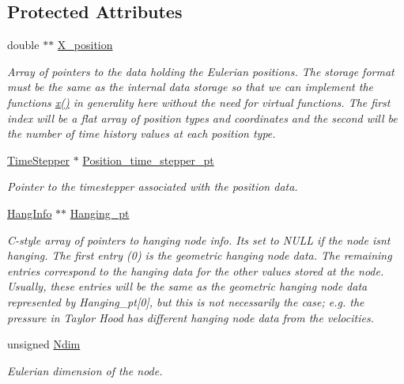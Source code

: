 \subsection*{Protected Attributes}
\begin{DoxyCompactItemize}
\item 
double $\ast$$\ast$ \hyperlink{classoomph_1_1Node_a908941e709ac28995147ab090f2cbf90}{X\+\_\+position}
\begin{DoxyCompactList}\small\item\em Array of pointers to the data holding the Eulerian positions. The storage format must be the same as the internal data storage so that we can implement the functions \hyperlink{classoomph_1_1Node_a056f8e82da938369cd38541c5cdc598a}{x()} in generality here without the need for virtual functions. The first index will be a flat array of position types and coordinates and the second will be the number of time history values at each position type. \end{DoxyCompactList}\item 
\hyperlink{classoomph_1_1TimeStepper}{Time\+Stepper} $\ast$ \hyperlink{classoomph_1_1Node_a8cf734873ab29a412289f8ac2d3be348}{Position\+\_\+time\+\_\+stepper\+\_\+pt}
\begin{DoxyCompactList}\small\item\em Pointer to the timestepper associated with the position data. \end{DoxyCompactList}\item 
\hyperlink{classoomph_1_1HangInfo}{Hang\+Info} $\ast$$\ast$ \hyperlink{classoomph_1_1Node_a4efe1b8b72dd6eb748dd21109eb1bf54}{Hanging\+\_\+pt}
\begin{DoxyCompactList}\small\item\em C-\/style array of pointers to hanging node info. It\textquotesingle{}s set to N\+U\+LL if the node isn\textquotesingle{}t hanging. The first entry (0) is the geometric hanging node data. The remaining entries correspond to the hanging data for the other values stored at the node. Usually, these entries will be the same as the geometric hanging node data represented by Hanging\+\_\+pt\mbox{[}0\mbox{]}, but this is not necessarily the case; e.\+g. the pressure in Taylor Hood has different hanging node data from the velocities. \end{DoxyCompactList}\item 
unsigned \hyperlink{classoomph_1_1Node_aa8ce049e9f9de38fa20d886a5c6b8116}{Ndim}
\begin{DoxyCompactList}\small\item\em Eulerian dimension of the node. \end{DoxyCompactList}\item 

\end{DoxyCompactItemize}
